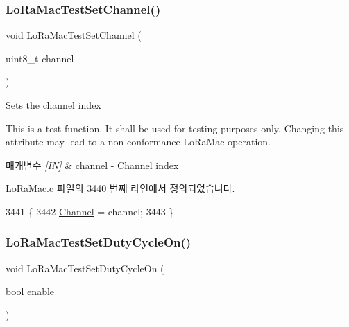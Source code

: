 \subsubsection{\texorpdfstring{Lo\+Ra\+Mac\+Test\+Set\+Channel()}{LoRaMacTestSetChannel()}}
{\footnotesize\ttfamily void Lo\+Ra\+Mac\+Test\+Set\+Channel (\begin{DoxyParamCaption}\item[{uint8\+\_\+t}]{channel }\end{DoxyParamCaption})}



Sets the channel index 

This is a test function. It shall be used for testing purposes only. Changing this attribute may lead to a non-\/conformance Lo\+Ra\+Mac operation.


\begin{DoxyParams}{매개변수}
{\em \mbox{[}\+I\+N\mbox{]}} & channel -\/ Channel index \\
\hline
\end{DoxyParams}


Lo\+Ra\+Mac.\+c 파일의 3440 번째 라인에서 정의되었습니다.


\begin{DoxyCode}
3441 \{
3442     \mbox{\hyperlink{_lo_ra_mac_8c_a1ca6f01ca18afe402de51babe8c95f5e}{Channel}} = channel;
3443 \}
\end{DoxyCode}
\mbox{\label{group___l_o_r_a_m_a_c_t_e_s_t_gacee5e0492e548af9e1ec5a995e460865}} 
\subsubsection{\texorpdfstring{Lo\+Ra\+Mac\+Test\+Set\+Duty\+Cycle\+On()}{LoRaMacTestSetDutyCycleOn()}}
{\footnotesize\ttfamily void Lo\+Ra\+Mac\+Test\+Set\+Duty\+Cycle\+On (\begin{DoxyParamCaption}\item[{bool}]{enable }\end{DoxyParamCaption})}



